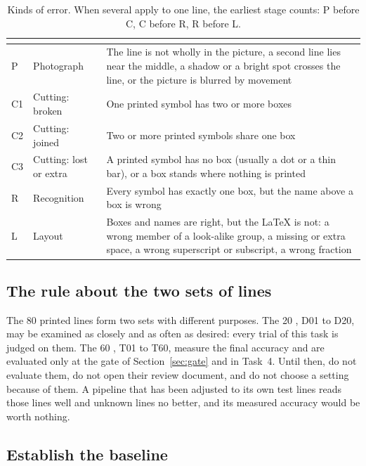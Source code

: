 \begin{table}[H]
\centering
\begin{tabular}{C{1.0cm}L{2.5cm}L{7.6cm}}
\toprule
{} &  &  \\
\midrule
P & Photograph & The line is not wholly in the picture, a second line lies near the middle, a
  shadow or a bright spot crosses the line, or the picture is blurred by movement \\
C1 & Cutting: broken & One printed symbol has two or more boxes \\
C2 & Cutting: joined & Two or more printed symbols share one box \\
C3 & Cutting: lost or extra & A printed symbol has no box (usually a dot or a thin bar), or a box
  stands where nothing is printed \\
R & Recognition & Every symbol has exactly one box, but the name above a box is wrong \\
L & Layout & Boxes and names are right, but the \LaTeX{} is not: a wrong member of a look-alike
  group, a missing or extra space, a wrong superscript or subscript, a wrong fraction \\
\bottomrule
\end{tabular}
\caption{Kinds of error. When several apply to one line, the earliest stage counts: P before C,
C before R, R before L.}
\label{tab:kinds}
\end{table}

\subsection{The rule about the two sets of lines}

The 80 printed lines form two sets with different purposes. The 20 ,
D01 to D20, may be examined as closely and as often as desired: every trial of this task is
judged on them. The 60 , T01 to T60, measure the final accuracy and are
evaluated only at the gate of Section~\ref{sec:gate} and in Task~4. Until then, do not
evaluate them, do not open their review document, and do not choose a setting because of them.
A pipeline that has been adjusted to its own test lines reads those lines well and unknown
lines no better, and its measured accuracy would be worth nothing.

\subsection{Establish the baseline}

